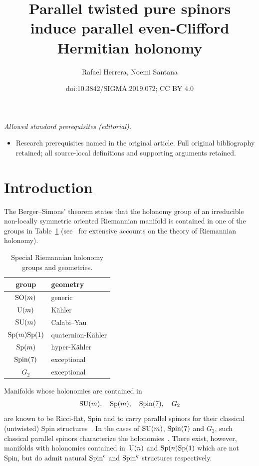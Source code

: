 \documentclass[10pt,a4paper]{amsart}
\title{Parallel twisted pure spinors induce parallel even-Clifford Hermitian holonomy}
\author{Rafael Herrera, Noemi Santana}
\date{doi:10.3842/SIGMA.2019.072; CC BY 4.0}
\numberwithin{equation}{section}
\begin{document}
\maketitle
\noindent\textit{Allowed standard prerequisites (editorial).}\begin{itemize}
\item Research prerequisites named in the original article. Full original bibliography retained; all source-local definitions and supporting arguments retained.
\end{itemize}\medskip
\section{Introduction}

The Berger--Simons' theorem \cite{Berger, Simons} states that the holonomy group of an irreducible non-locally symmetric oriented Riemannian manifold is contained in one of the groups in Table~\ref{table: Berger list} (see~\cite{Joyce, Salamon} for extensive accounts on the theory of Riemannian holonomy).
\begin{table}[h!]\centering
\begin{tabular}{|c|l|}\hline
group & geometry\\\hline
${\rm SO}(m)$ & generic\\
${\rm U}(m)$ & K\"ahler\\
${\rm SU}(m)$ & Calabi--Yau\\
${\rm Sp}(m){\rm Sp}(1)$ & quaternion-K\"ahler\\
${\rm Sp}(m)$ & hyper-K\"ahler\\
${\rm Spin}(7)$ & exceptional\\
$G_2$ & exceptional\\\hline
\end{tabular}
\caption{Special Riemannian holonomy groups and geometries.}\label{table: Berger list}
\end{table}

Manifolds whose holonomies are contained in
\begin{gather*} {\rm SU}(m), \quad {\rm Sp}(m), \quad {\rm Spin}(7),\quad G_2
\end{gather*}
are known to be Ricci-flat, Spin and to carry parallel spinors for their
classical (untwisted) Spin structures~\cite{Hitchin,Wang}. In the cases of ${\rm SU}(m)$, ${\rm Spin}(7)$ and $G_2$, such classical parallel
spinors characterize the holonomies~\cite{Lawson}.
There exist, however, manifolds with holonomies contained in~${\rm U}(n)$ and ${\rm Sp}(n){\rm Sp}(1)$ which are not Spin, but do admit
natural ${\rm Spin}^c$ and ${\rm Spin}^q$ structures respectively.
\end{document}
